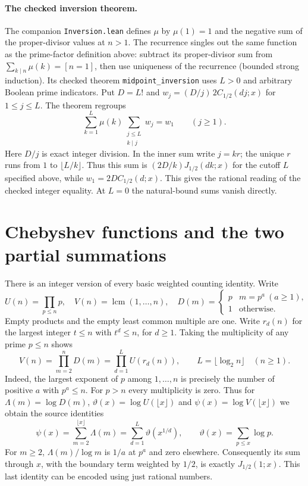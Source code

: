 \paragraph{The checked inversion theorem.}
The companion \texttt{Inversion.lean} defines $\mu$ by $\mu(1)=1$ and the negative sum of the proper-divisor values at $n>1$. The recurrence singles out the same function as the prime-factor definition above: subtract its proper-divisor sum from $\sum_{k\mid n}\mu(k)=[n=1]$, then use uniqueness of the recurrence (bounded strong induction). Its checked theorem \texttt{midpoint\_inversion} uses $L>0$ and arbitrary Boolean prime indicators. Put $D=L!$ and $w_j=(D/j)\,2C_{1/2}(dj;x)$ for $1\le j\le L$. The theorem regroups
\[
 \sum_{k=1}^L\mu(k)\sum_{\substack{j\le L\\k\mid j}}w_j=w_1
 \qquad (j\ge1).
\]
Here $D/j$ is exact integer division. In the inner sum write $j=kr$; the unique $r$ runs from $1$ to $\lfloor L/k\rfloor$. Thus this sum is $(2D/k)J_{1/2}(dk;x)$ for the cutoff $L$ specified above, while $w_1=2D C_{1/2}(d;x)$. This gives the rational reading of the checked integer equality. At $L=0$ the natural-bound sums vanish directly.

\section{Chebyshev functions and the two partial summations}
\label{sec:weights}
There is an integer version of every basic weighted counting identity. Write
\[
 U(n)=\prod_{p\le n}p,\quad V(n)=\operatorname{lcm}(1,\ldots,n),\quad
 D(m)=\begin{cases}p&m=p^a\ (a\ge1),\\1&\text{otherwise}.\end{cases}
\]
Empty products and the empty least common multiple are one. Write $r_d(n)$ for the largest integer $t\le n$ with $t^d\le n$, for $d\ge1$. Taking the multiplicity of any prime $p\le n$ shows
\[
 V(n)=\prod_{m=2}^nD(m)=\prod_{d=1}^{L}U(r_d(n)),\qquad L=\lfloor\log_2 n\rfloor\quad(n\ge1).
\]
Indeed, the largest exponent of $p$ among $1,\ldots,n$ is precisely the number of positive $a$ with $p^a\le n$. For $p>n$ every multiplicity is zero. Thus for $\Lambda(m)=\log D(m)$, $\vartheta(x)=\log U(\lfloor x\rfloor)$ and $\psi(x)=\log V(\lfloor x\rfloor)$ we obtain the source identities
\[
 \psi(x)=\sum_{m=2}^{\lfloor x\rfloor}\Lambda(m)
       =\sum_{d=1}^{L}\vartheta(x^{1/d}),\qquad
 \vartheta(x)=\sum_{p\le x}\log p.
\]
For $m\ge2$, $\Lambda(m)/\log m$ is $1/a$ at $p^a$ and zero elsewhere. Consequently its sum through $x$, with the boundary term weighted by $1/2$, is exactly $J_{1/2}(1;x)$. This last identity can be encoded using just rational numbers.

